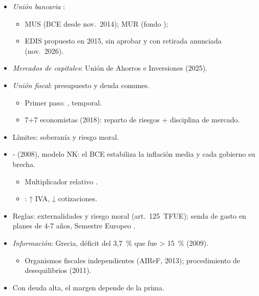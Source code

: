 \documentclass{article}
\begin{document}
\begin{columnas}
\begin{itemize}
\item \emph{Unión bancaria} :
  \begin{itemize}
  \item MUS (BCE desde nov.\ 2014); MUR (fondo );
  \item EDIS propuesto en 2015, sin aprobar y con retirada anunciada (nov.\ 2026).
  \end{itemize}
\item \emph{Mercados de capitales}: Unión de Ahorros e Inversiones (2025).
\item \emph{Unión fiscal}: presupuesto y deuda comunes.
  \begin{itemize}
  \item Primer paso: , temporal.
  \item 7+7 economistas (2018): reparto de riesgos + disciplina de mercado.
  \end{itemize}
\item Límites: soberanía y riesgo moral.
\end{itemize}
\begin{itemize}
\item {}- (2008), modelo NK: el BCE estabiliza la inflación media y cada gobierno su brecha.
  \begin{itemize}
  \item Multiplicador relativo .
  \item {}: ↑ IVA, ↓ cotizaciones.
  \end{itemize}
\item Reglas: externalidades y riesgo moral (art.~125~TFUE); senda de gasto en planes de 4-7 años, Semestre Europeo .
\item \emph{Información}: Grecia, déficit del 3,7~\% que fue > 15~\% (2009).
  \begin{itemize}
  \item Organismos fiscales independientes (AIReF, 2013); procedimiento de desequilibrios (2011).
  \end{itemize}
\item Con deuda alta, el margen depende de la prima.
\end{itemize}


\end{columnas}
\end{document}
